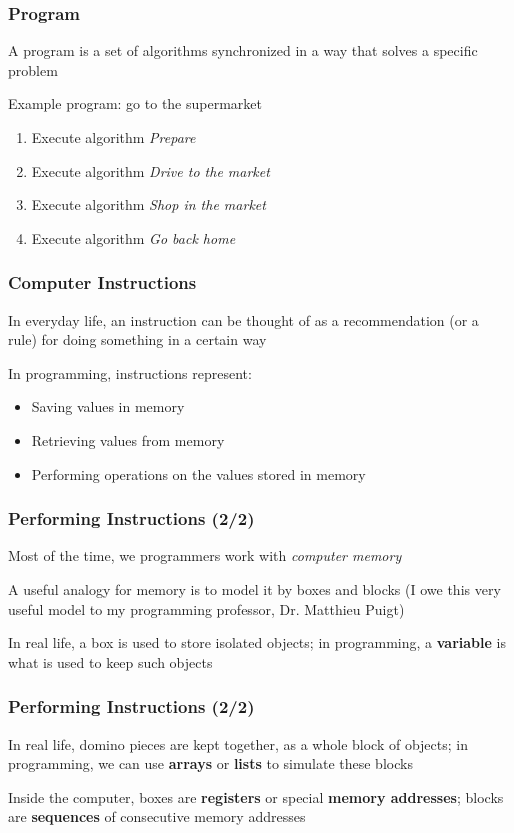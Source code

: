 \documentclass{beamer}
\begin{document}
\begin{frame}
\frametitle{Program}
    A program is a set of algorithms synchronized in a way that solves a specific problem
    \newline

    Example program: go to the supermarket
    \begin{enumerate}
        \item Execute algorithm \emph{Prepare}
        \item Execute algorithm \emph{Drive to the market}
        \item Execute algorithm \emph{Shop in the market}
        \item Execute algorithm \emph{Go back home}
    \end{enumerate}
\end{frame}

\begin{frame}
\frametitle{Computer Instructions}
    In everyday life, an instruction can be thought of as a recommendation (or a rule) for doing something in a certain way
    \newline

    In programming, instructions represent:
    \begin{itemize}
        \item Saving values in memory
        \item Retrieving values from memory
        \item Performing operations on the values stored in memory
    \end{itemize}
\end{frame}

\begin{frame}
\frametitle{Performing Instructions (2/2)}
    Most of the time, we programmers work with \emph{computer memory}
    \newline

    A useful analogy for memory is to model it by boxes and blocks (I owe this very useful model to my programming professor, Dr. Matthieu Puigt)
    \newline

    In real life, a box is used to store isolated objects; in programming, a \textbf{variable} is what is used to keep such objects
\end{frame}

\begin{frame}
\frametitle{Performing Instructions (2/2)}
    In real life, domino pieces are kept together, as a whole block of objects; in programming, we can use \textbf{arrays} or \textbf{lists} to simulate these blocks
    \newline

    Inside the computer, boxes are \textbf{registers} or special \textbf{memory addresses}; blocks are \textbf{sequences} of consecutive memory addresses
\end{frame}
\end{document}
